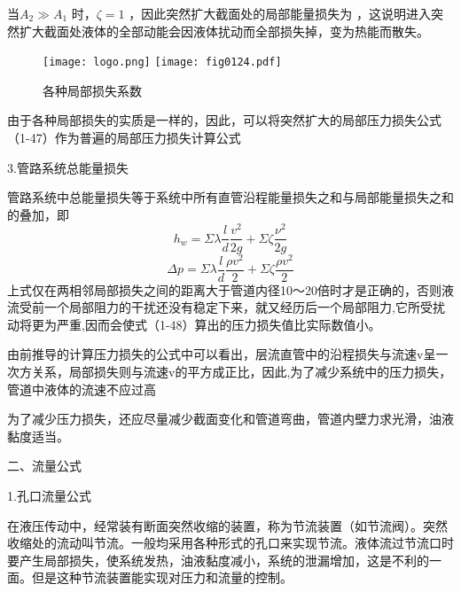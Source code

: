 当$ A_2\gg A_1 $ 时，$ \zeta =1 $ ，因此突然扩大截面处的局部能量损失为 ，这说明进入突然扩大截面处液体的全部动能会因液体扰动而全部损失掉，变为热能而散失。


\begin{figure}[h]\centering
\ifOpenSource
\texttt{[image: logo.png]}
\else
\texttt{[image: fig0124.pdf]}
\fi
\caption{各种局部损失系数}
\label{fig:fig0124}
\end{figure}










由于各种局部损失的实质是一样的，因此，可以将突然扩大的局部压力损失公式（1-47）作为普遍的局部压力损失计算公式

3.管路系统总能量损失

管路系统中总能量损失等于系统中所有直管沿程能量损失之和与局部能量损失之和的叠加，即
$$ h_w=\varSigma \lambda \frac{l}{d}\frac{v^2}{2g}+\varSigma \zeta \frac{\nu ^2}{2g} $$ 
$$ \varDelta p=\varSigma \lambda \frac{l}{d}\frac{\rho v^2}{2}+\varSigma \zeta \frac{\rho v^2}{2} $$ 
上式仅在两相邻局部损失之间的距离大于管道内径10〜20倍时才是正确的，否则液流受前一个局部阻力的干扰还没有稳定下来，就又经历后一个局部阻力,它所受扰动将更为严重,因而会使式（1-48）算出的压力损失值比实际数值小。

由前推导的计算压力损失的公式中可以看出，层流直管中的沿程损失与流速v呈一次方关系，局部损失则与流速v的平方成正比，因此,为了减少系统中的压力损失，管道中液体的流速不应过高

为了减少压力损失，还应尽量减少截面变化和管道弯曲，管道内壁力求光滑，油液黏度适当。

二、流量公式

1.孔口流量公式

在液压传动中，经常装有断面突然收缩的装置，称为节流装置（如节流阀）。突然收缩处的流动叫节流。一般均采用各种形式的孔口来实现节流。液体流过节流口时要产生局部损失，使系统发热，油液黏度减小，系统的泄漏增加，这是不利的一面。但是这种节流装置能实现对压力和流量的控制。

